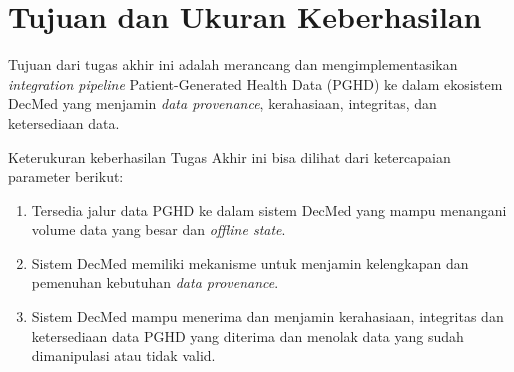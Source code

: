 \section{Tujuan dan Ukuran Keberhasilan}

Tujuan dari tugas akhir ini adalah merancang dan mengimplementasikan \textit{integration pipeline} Patient-Generated Health Data (PGHD) ke dalam ekosistem DecMed yang menjamin \textit{data provenance}, kerahasiaan, integritas, dan ketersediaan data.

Keterukuran keberhasilan Tugas Akhir ini bisa dilihat dari ketercapaian parameter berikut:

\begin{enumerate}
    \item Tersedia jalur data PGHD ke dalam sistem DecMed yang mampu menangani volume data yang besar dan \textit{offline state}\@.

    \item Sistem DecMed memiliki mekanisme untuk menjamin kelengkapan dan pemenuhan kebutuhan \textit{data provenance}\@. %

    \item Sistem DecMed mampu menerima dan menjamin kerahasiaan, integritas dan ketersediaan data PGHD yang diterima dan menolak data yang sudah dimanipulasi atau tidak valid. %
\end{enumerate}